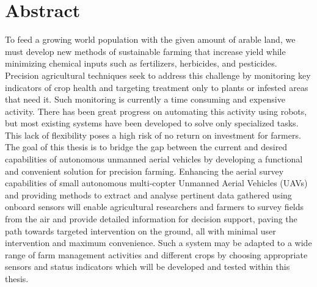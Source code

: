 \section*{Abstract}

To feed a growing world population with the given amount of arable land, we must develop new methods of sustainable farming that increase yield while minimizing chemical inputs such as fertilizers, herbicides, and pesticides. Precision agricultural techniques seek to address this challenge by monitoring key indicators of crop health and targeting treatment only to plants or infested areas that need it. Such monitoring is currently a time consuming and expensive activity. There has been great progress on automating this activity using robots, but most existing systems have been developed to solve only specialized tasks. This lack of flexibility poses a high risk of no return on investment for farmers.
The goal of this thesis is to bridge the gap between the current and desired capabilities of autonomous unmanned aerial vehicles by developing a functional and convenient solution for precision farming. Enhancing the aerial survey capabilities of small autonomous multi-copter Unmanned Aerial Vehicles (UAVs) and providing methods to extract and analyse pertinent data gathered using onboard sensors will enable agricultural researchers and farmers to survey fields from the air and provide detailed information for decision support, paving the path towards targeted intervention on the ground, all with minimal user intervention and maximum convenience. Such a system may be adapted to a wide range of farm management activities and different crops by choosing appropriate sensors and status indicators which will be developed and tested within this thesis.